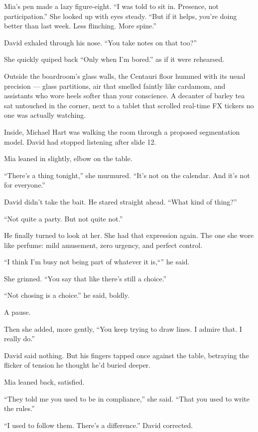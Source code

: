 Mia’s pen made a lazy figure-eight. ``I was told to sit in. Presence, not participation.'' She looked up  
with eyes steady. ``But if it helps, you’re doing better than last week. Less flinching. More spine.''

David exhaled through his nose. ``You take notes on that too?''

She quickly quiped back ``Only when I’m bored.'' as if it were rehearsed.

Outside the boardroom’s glass walls, the Centauri floor hummed with its usual precision — glass partitions, air 
that smelled faintly like cardamom, and assistants who wore heels softer than your conscience. A decanter of barley 
tea sat untouched in the corner, next to a tablet that scrolled real-time FX tickers no one was actually watching.

Inside, Michael Hart was walking the room through a proposed segmentation model. David had stopped listening 
after slide 12.

Mia leaned in slightly, elbow on the table.

``There’s a thing tonight,'' she murmured. ``It's not on the calendar. And it's not for everyone.''

David didn’t take the bait. He stared straight ahead. ``What kind of thing?''

``Not quite a party. But not quite not.''

He finally turned to look at her. She had that expression again. The one she wore like perfume: mild amusement, 
zero urgency, and perfect control.

``I think I’m busy not being part of whatever it is,``'' he said.

She grinned. ``You say that like there’s still a choice.''

``Not chosing is a choice.'' he said, boldly.

A pause.

Then she added, more gently, ``You keep trying to draw lines. I admire that. I really do.''

David said nothing. But his fingers tapped once against the table, betraying the flicker of tension he thought 
he’d buried deeper.

Mia leaned back, satisfied.

``They told me you used to be in compliance,'' she said. ``That you used to write the rules.''

``I used to follow them. There's a difference.'' David corrected.

